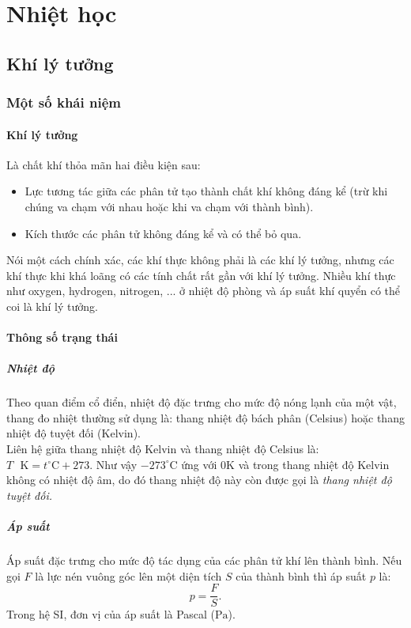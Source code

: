 \part{Nhiệt học}
\chapter{Khí lý tưởng}
\section{Một số khái niệm}
\subsection{Khí lý tưởng}
Là chất khí thỏa mãn hai điều kiện sau:
\begin{itemize}
\item Lực tương tác giữa các phân tử tạo thành chất khí không đáng kể (trừ khi chúng va chạm với nhau hoặc khi va chạm với thành bình).
\item Kích thước các phân tử không đáng kể và có thể bỏ qua.
\end{itemize}
Nói một cách chính xác, các khí thực không phải là các khí lý tưởng, nhưng các khí thực khi khá loãng có các tính chất rất gần với khí lý tưởng. Nhiều khí thực như oxygen, hydrogen, nitrogen, ... ở nhiệt độ phòng và áp suất khí quyển có thể coi là khí lý tưởng.
\subsection{Thông số trạng thái}
\subsubsection{Nhiệt độ}
Theo quan điểm cổ điển, nhiệt độ đặc trưng cho mức độ nóng lạnh của một vật, thang đo nhiệt thường sử dụng là: thang nhiệt độ bách phân (Celsius) hoặc thang nhiệt độ tuyệt đối (Kelvin).\\
Liên hệ giữa thang nhiệt độ Kelvin và thang nhiệt độ Celsius là: $T \text{ } \mathrm{K} = t^ \circ \mathrm{C} + 273.$ Như vậy $-273 ^\circ \mathrm{C}$ ứng với $0 \mathrm{K}$ và trong thang nhiệt độ Kelvin không có nhiệt độ âm, do đó thang nhiệt độ này còn được gọi là \textit{thang nhiệt độ tuyệt đối.}
\subsubsection{Áp suất}
Áp suất đặc trưng cho mức độ tác dụng của các phân tử khí lên thành bình. Nếu gọi $F$ là lực nén vuông góc lên một diện tích $S$ của thành bình thì áp suất $p$ là:
$$p = \frac{F}{S}.$$
Trong hệ SI, đơn vị của áp suất là Pascal ($\mathrm{Pa}$).
